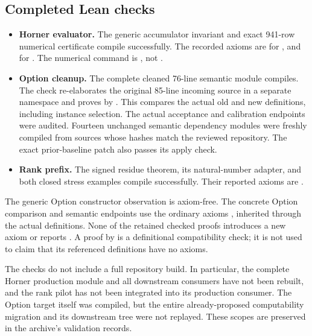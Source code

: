 \subsection{Completed Lean checks}

\begin{itemize}
\item \textbf{Horner evaluator.} The generic accumulator invariant and exact 941-row numerical certificate compile successfully. The recorded axioms are  for , and  for . The numerical command is , not .
\item \textbf{Option cleanup.} The complete cleaned 76-line semantic module compiles. The check re-elaborates the original 85-line incoming source in a separate namespace and proves  by . This compares the actual old and new  definitions, including instance selection. The actual acceptance and calibration endpoints were audited. Fourteen unchanged semantic dependency modules were freshly compiled from sources whose hashes match the reviewed repository. The exact prior-baseline patch also passes its apply check.
\item \textbf{Rank prefix.} The signed residue theorem, its natural-number adapter, and both closed stress examples compile successfully. Their reported axioms are .
\end{itemize}

The generic Option constructor observation is axiom-free. The concrete Option comparison and semantic endpoints use the ordinary axioms , inherited through the actual definitions. None of the retained checked proofs introduces a new axiom or reports . A proof by  is a definitional compatibility check; it is not used to claim that its referenced definitions have no axioms.

The checks do not include a full repository build. In particular, the complete Horner production module and all downstream consumers have not been rebuilt, and the rank pilot has not been integrated into its production consumer. The Option target itself was compiled, but the entire already-proposed computability migration and its downstream tree were not replayed. These scopes are preserved in the archive's validation records.
